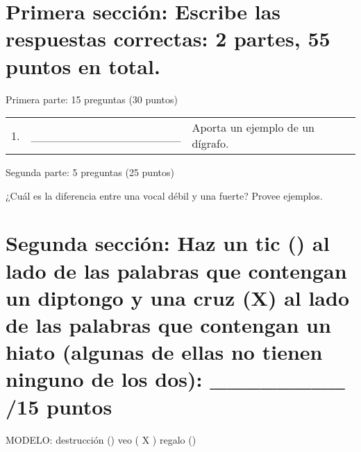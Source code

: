 \documentclass[12pt]{exam}
\begin{document}
\vspace{0.1in} 

\section{Primera sección: Escribe las respuestas correctas: 2 partes, 55 puntos en total.}
\noindent \begin{bf}Primera parte: 15 preguntas (30 puntos)\end{bf}

\renewcommand{\arraystretch}{1.63}
	\begin{tabular}{@{}lcp{1in}@{}}
	 1.  & \_\_\_\_\_\_\_\_\_\_\_\_\_\_\_\_\_\_ & Aporta un ejemplo de un dígrafo.                           \\
	\end{tabular}
		
\vspace{3mm}\noindent \begin{bf}Segunda parte: 5 preguntas (25 puntos)\end{bf}

		\begin{questions}
			\question ¿Cuál es la diferencia entre una vocal débil y una fuerte? Provee ejemplos.
			\fillwithlines{1.45in}
		\end{questions}







\section{Segunda sección: Haz un tic (\checked) al lado de las palabras que contengan un diptongo y una cruz (X) al lado de las palabras que contengan un hiato (algunas de ellas no tienen ninguno de los dos): \_\_\_\_\_\_\_\_ /15 puntos}

\vspace{5mm}
\hspace{1mm}\begin{bf}MODELO: destrucción \hspace{5mm}(\checked) \hspace{9mm}veo \hspace{14mm}( X ) \hspace{7.5mm}regalo \hspace{12.25mm}(\hspace{2.5mm})\end{bf}\\
\renewcommand{\arraystretch}{1.275}
\vspace{1.5mm}
\end{document}
